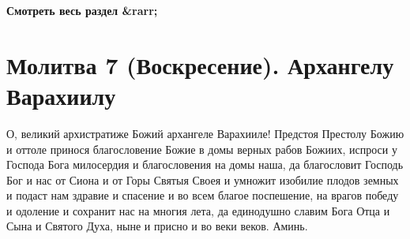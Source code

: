 \mychapterending




\bfseries Смотреть весь раздел &rarr;\normalfont{} 

\section{Молитва 7 (Воскресение).    Архангелу Варахиилу}



О, великий архистратиже Божий архангеле Варахииле! Предстоя Престолу Божию и оттоле принося благословение Божие в домы верных рабов Божиих, испроси у Господа Бога милосердия и благословения на домы наша, да благословит Господь Бог и нас от Сиона и от Горы Святыя Своея и умножит изобилие плодов земных и подаст нам здравие и спасение и во всем благое поспешение, на врагов победу и одоление и сохранит нас на многия лета, да единодушно славим Бога Отца и Сына и Святого Духа, ныне и присно и во веки веков. Аминь.


\mychapterending
